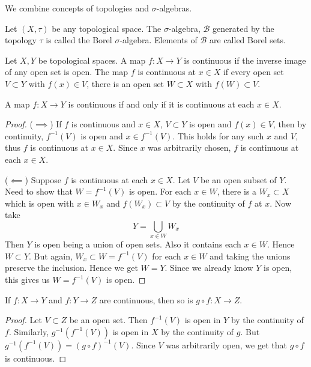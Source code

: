 We combine concepts of topologies and $\sigma$-algebras. 
\begin{definition}
  Let $(X, \tau)$ be any topological space. The $\sigma$-algebra, $\mathscr{B}$ generated by the topology $\tau$ is called the Borel $\sigma$-algebra. Elements of $\mathscr{B}$ are called Borel sets.
\end{definition}
\begin{definition}
  Let $X, Y$ be topological spaces. A map $f: X \to Y$ is continuous if the inverse image of any open set is open. The map $f$ is continuous at $x \in X$ if every open set $V \subset Y$ with $f(x) \in V$, there is an open set $W \subset X$ with $f(W) \subset V$.
\end{definition}

\begin{theorem}
  A map $f: X \to Y$ is continuous if and only if it is continuous at each $x \in X$.
\end{theorem}
\begin{proof}
  ($\implies$) If $f$ is continuous and $x \in X$, $V \subset Y$ is open and $f(x) \in V$, then by continuity, $f^{-1}(V)$ is open and $x \in f^{-1}(V)$. This holds for any such $x$ and $V$, thus $f$ is continuous at $x \in X$. Since $x$ was arbitrarily chosen, $f$ is continuous at each $x \in X$.

  ($\impliedby$) Suppose $f$ is continuous at each $x \in X$. Let $V$ be an open subset of $Y$. Need to show that $W = f^{-1}(V)$ is open. For each $x \in W$, there is a $W_x \subset X$ which is open with $x \in W_x$ and $f(W_x) \subset V$ by the continuity of $f$ at $x$. Now take $$Y = \bigcup_{x \in W} W_x$$
  Then $Y$ is open being a union of open sets. Also it contains each $x \in W$. Hence $W \subset Y$. But again, $W_x \subset W = f^{-1}(V)$ for each $x \in W$ and taking the unions preserve the inclusion. Hence we get $W = Y$. Since we already know $Y$ is open, this gives us $W = f^{-1}(V)$ is open.
\end{proof}

\begin{proposition}
  If $f: X \to Y$ and $f: Y \to Z$ are continuous, then so is $g\circ f: X \to Z$.
\end{proposition}
\begin{proof}
  Let $V \subset Z$ be an open set. Then $f^{-1}(V)$ is open in $Y$ by the continuity of $f$. Similarly, $g^{-1}(f^{-1}(V))$ is open in $X$ by the continuity of $g$. But $ g^{-1}(f^{-1}(V)) = (g \circ f)^{-1}(V)$. Since $V$  was arbitrarily open, we get that $g\circ f$ is continuous.
\end{proof}

